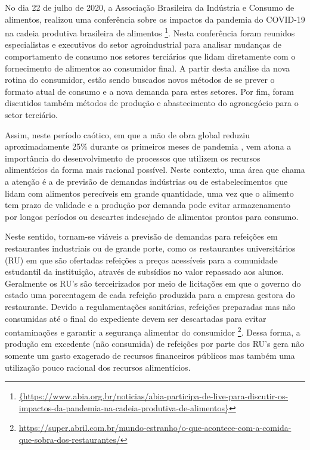No dia 22 de julho de 2020, a Associação Brasileira da Indústria e Consumo de alimentos, realizou uma conferência sobre os impactos da pandemia do COVID-19 na cadeia produtiva brasileira de alimentos \footnote{\url{{https://www.abia.org.br/noticias/abia-participa-de-live-para-discutir-os-impactos-da-pandemia-na-cadeia-produtiva-de-alimentos}}}. Nesta conferência foram reunidos especialistas e executivos do setor agroindustrial para analisar mudanças de comportamento de consumo nos setores terciários que lidam diretamente com o fornecimento de alimentos ao consumidor final. A partir desta análise da nova rotina do consumidor, estão sendo buscados novos métodos de se prever o formato atual de consumo e a nova demanda para estes setores. Por fim, foram discutidos também métodos de produção e abastecimento do agronegócio para o setor terciário.

Assim, neste período caótico, em que a mão de obra global reduziu aproximadamente 25\% durante os primeiros meses de pandemia \cite{huff2015resilient}, vem atona a importância do desenvolvimento de processos que utilizem os recursos alimentícios da forma mais racional possível. Neste contexto, uma área que chama a atenção é a de previsão de demandas indústrias ou de estabelecimentos que lidam com alimentos perecíveis em grande quantidade, uma vez que o alimento tem prazo de validade e a produção por demanda pode evitar armazenamento por longos períodos ou descartes indesejado de alimentos prontos para consumo.

Neste sentido, tornam-se viáveis a previsão de demandas para refeições em restaurantes industriais ou de grande porte, como os restaurantes universitários (RU) em que são ofertadas refeições a preços acessíveis para a comunidade estudantil da instituição, através de subsídios no valor repassado aos alunos. Geralmente os RU's são terceirizados por meio de licitações em que o governo do estado uma porcentagem de cada refeição produzida para a empresa gestora do restaurante. Devido a regulamentações sanitárias, refeições preparadas mas não consumidas até o final do expediente devem ser descartadas para evitar contaminações e garantir a segurança alimentar do consumidor \footnote{\url{https://super.abril.com.br/mundo-estranho/o-que-acontece-com-a-comida-que-sobra-dos-restaurantes/}}. Dessa forma, a produção em excedente (não consumida) de refeições por parte dos RU's gera não somente um gasto exagerado de recursos financeiros públicos mas também uma utilização pouco racional dos recursos alimentícios.

